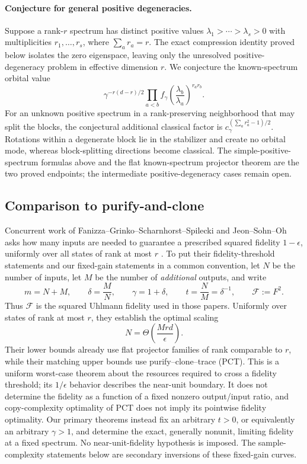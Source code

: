 \documentclass[11pt]{article}
\theoremstyle{remark}
\theoremstyle{plain}
\begin{document}
\paragraph{Conjecture for general positive degeneracies.}
Suppose a rank-\(r\) spectrum has distinct positive values
\(\lambda_1>\cdots>\lambda_s>0\) with multiplicities
\(r_1,\ldots,r_s\), where \(\sum_a r_a=r\).  The exact compression identity
proved below isolates the zero eigenspace, leaving only the unresolved
positive-degeneracy problem in effective dimension \(r\).  We conjecture the
known-spectrum orbital value
\[
  \gamma^{-r(d-r)/2}
  \prod_{a<b}
  f_\gamma\!\left(\frac{\lambda_b}{\lambda_a}\right)^{r_ar_b}.
\]
For an unknown positive spectrum in a rank-preserving neighborhood that may
split the blocks, the conjectural additional classical factor is
\(c_\gamma^{(\sum_a r_a^2-1)/2}\).  Rotations within a degenerate block lie
in the stabilizer and create no orbital mode, whereas block-splitting
directions become classical.  The simple-positive-spectrum formulas above and the
flat known-spectrum projector theorem are the two proved endpoints; the
intermediate positive-degeneracy cases remain open.

\subsection{Comparison to purify-and-clone}
\label{sec:pct-comparison}

Concurrent work of Fanizza--Grinko--Scharnhorst--Spilecki and
Jeon--Sohn--Oh asks how many inputs are needed to guarantee a prescribed
squared fidelity \(1-\epsilon\), uniformly over all states of rank at most
\(r\) \cite{FanizzaGrinkoScharnhorstSpilecki2026,JeonSohnOh2026}.  To put
their fidelity-threshold statements and our fixed-gain statements in a
common convention, let \(N\) be the number of inputs, let \(M\) be the number
of \emph{additional} outputs, and write
\[
  m=N+M,\qquad
  \delta=\frac{M}{N},\qquad
  \gamma=1+\delta,\qquad
  t=\frac{N}{M}=\delta^{-1},\qquad
  \mathcal F:=F^2.
\]
Thus \(\mathcal F\) is the squared Uhlmann fidelity used in those papers.
Uniformly over states of rank at most \(r\), they establish the optimal
scaling
\[
  N=\Theta\!\left(\frac{Mrd}{\epsilon}\right).
\]
Their lower bounds already use flat projector families of rank comparable to
\(r\), while their matching upper bounds use purify--clone--trace (PCT).
This is a uniform worst-case theorem about the resources required to cross a
fidelity threshold; its \(1/\epsilon\) behavior describes the near-unit
boundary.  It does not determine the fidelity as a function of a fixed
nonzero output/input ratio, and copy-complexity optimality of PCT does not
imply its pointwise fidelity optimality.  Our primary theorems instead fix an
arbitrary \(t>0\), or equivalently an arbitrary \(\gamma>1\), and determine the
exact, generally nonunit, limiting fidelity at a fixed spectrum.  No
near-unit-fidelity hypothesis is imposed.  The sample-complexity statements
below are secondary inversions of these fixed-gain curves.
\end{document}
